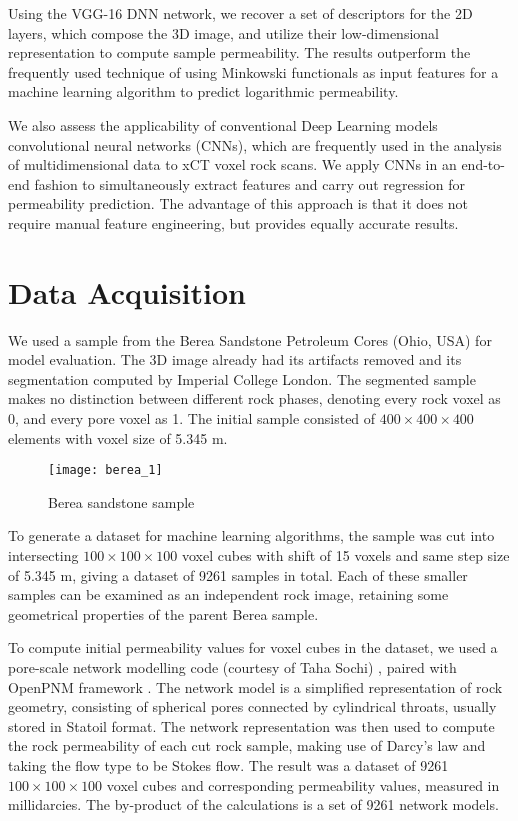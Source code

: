 \documentclass[review]{elsarticle}
\begin{document}
Using the VGG-16 DNN \cite{simonyan2014very} network, we recover a set of descriptors for the 2D layers, which compose the 3D image, and utilize their low-dimensional representation to compute sample permeability. The results outperform the frequently used technique of using Minkowski functionals as input features for a machine learning algorithm to predict logarithmic permeability.

We also assess the applicability of conventional Deep Learning models  convolutional neural networks (CNNs), which are frequently used in the analysis of multidimensional data  to \textmu xCT voxel rock scans. We apply CNNs in an end-to-end fashion to simultaneously extract features and carry out regression for permeability prediction. The advantage of this approach is that it does not require manual feature engineering, but provides equally accurate results.

\section{Data Acquisition}

We used a sample from the Berea Sandstone Petroleum Cores (Ohio, USA) for model evaluation. The 3D image already had its artifacts removed and its segmentation computed by Imperial College London. The segmented sample makes no distinction between different rock phases, denoting every rock voxel as 0, and every pore voxel as 1. The initial sample consisted of $400 \times 400 \times 400$ elements with voxel size of 5.345 \textmu m.

\begin{wrapfigure}{r}{0.5\textwidth}
    \centering  \texttt{[image: berea\_1]}
    \caption{Berea sandstone sample}
\end{wrapfigure}

To generate a dataset for machine learning algorithms, the sample was cut into intersecting $100 \times 100 \times 100$ voxel cubes with shift of 15 voxels and same step size of 5.345 \textmu m, giving a dataset of 9261 samples in total. Each of these smaller samples can be examined as an independent rock image, retaining some geometrical properties of the parent Berea sample.

To compute initial permeability values for voxel cubes in the dataset, we used a pore-scale network modelling code (courtesy of Taha Sochi) \cite{sochi2010pore}, paired with OpenPNM framework \cite{putz2013introducing}. The network model is a simplified representation of rock geometry, consisting of spherical pores connected by cylindrical throats, usually stored in Statoil format. The network representation was then used to compute the rock permeability of each cut rock sample, making use of Darcy’s law and taking the flow type to be Stokes flow. The result was a dataset of 9261 $100 \times 100 \times 100$ voxel cubes and corresponding permeability values, measured in millidarcies. The by-product of the calculations is a set of 9261 network models.
\end{document}
